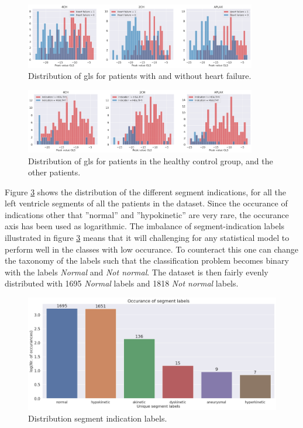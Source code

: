 \begin{figure}[h]
    \begin{center}
    \includegraphics[width=0.9\textwidth]{data-exp/gls_hf_dist.png}
    \end{center}
    \caption{Distribution of \acrshort{gls} for patients with and without heart failure.}
    \label{fig:gls_hf_dist}
\end{figure}

\begin{figure}[!h]
    \begin{center}
    \includegraphics[width=0.9\textwidth]{data-exp/gls_indication_dist.png}
    \end{center}
    \caption{Distribution of \acrshort{gls} for patients in the healthy control group, and the other patients.}
    \label{fig:gls_ind_dist}
\end{figure}

\newpage

Figure \ref{fig:segm_label_dist} shows the distribution of the different segment indications, for all the left ventricle segments of all the patients in the dataset. 
Since the occurance of indications other that ''normal'' and ''hypokinetic'' are very rare, the occurance axis has been used as logarithmic. 
The imbalance of segment-indication labels illustrated in figure \ref{fig:segm_label_dist} means that it will challenging for any statistical model 
to perform well in the classes with low occurance. 
To counteract this one can change the taxonomy of the labels such that the classification problem becomes binary with the labels \textit{Normal} and \textit{Not normal}. 
The dataset is then fairly evenly distributed with 1695 \textit{Normal} labels and 1818 \textit{Not normal} labels. \bigskip

\begin{figure}[!h]
    \begin{center}
    \includegraphics[width=\textwidth]{data-exp/segment_label_distribution.png}
    \end{center}
    \caption{Distribution segment indication labels.}
    \label{fig:segm_label_dist}
\end{figure}

